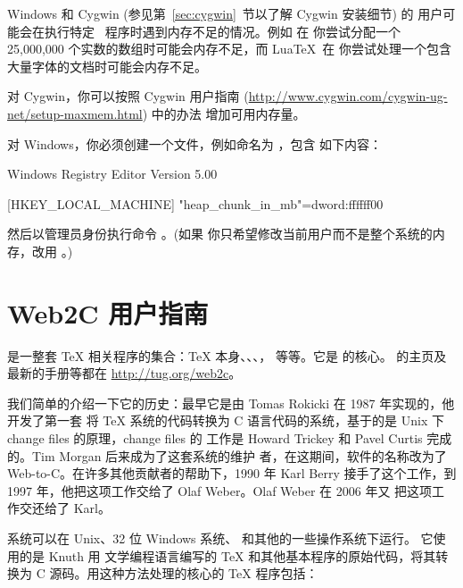 \documentclass{article}
\begin{document}
Windows 和 Cygwin (参见第~\ref{sec:cygwin}~节以了解 Cygwin 安装细节) 的
用户可能会在执行特定 \TL\ 程序时遇到内存不足的情况。例如  在
你尝试分配一个 25,000,000 个实数的数组时可能会内存不足，而 Lua\TeX\ 在
你尝试处理一个包含大量字体的文档时可能会内存不足。

对 Cygwin，你可以按照 Cygwin 用户指南
(\url{http://www.cygwin.com/cygwin-ug-net/setup-maxmem.html}) 中的办法
增加可用内存量。

对 Windows，你必须创建一个文件，例如命名为 ，包含
如下内容：

\begin{sverbatim}
Windows Registry Editor Version 5.00

[HKEY_LOCAL_MACHINE\Software\Cygwin]
"heap_chunk_in_mb"=dword:ffffff00
\end{sverbatim}

\noindent 然后以管理员身份执行命令 。(如果
你只希望修改当前用户而不是整个系统的内存，改用 。)

\section{Web2C 用户指南}

\Webc{} 是一整套 \TeX{} 相关程序的集合：\TeX{} 本身、\MF{}、\MP{}、\BibTeX{}，
等等。它是 \TL{} 的核心。\Webc{} 的主页及最新的手册等都在
\url{http://tug.org/web2c}。

我们简单的介绍一下它的历史：最早它是由 Tomas Rokicki 在 1987 年实现的，他开发了第一套
将 \TeX{} 系统的代码转换为 C 语言代码的系统，基于的是 Unix 下 change files
的原理，change files 的
工作是 Howard Trickey 和 Pavel Curtis 完成的。Tim Morgan 后来成为了这套系统的维护
者，在这期间，软件的名称改为了 Web-to-C\@。在许多其他贡献者的帮助下，1990 年 Karl Berry
接手了这个工作，到 1997 年，他把这项工作交给了 Olaf Weber。Olaf Weber 在 2006 年又
把这项工作交还给了 Karl。

\Webc{} 系统可以在 Unix、32 位 Windows 系统、\MacOSX{} 和其他的一些操作系统下运行。
它使用的是 Knuth 用 \web{} 文学编程语言编写的 \TeX{} 和其他基本程序的原始代码，将其转换为 C
源码。用这种方法处理的核心的 \TeX{} 程序包括：
\end{document}
